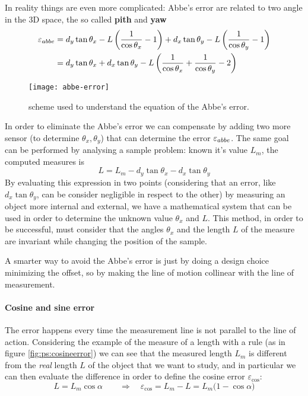 	In reality things are even more complicated: Abbe's error are related to two angle in the 3D space, the so called \textbf{pith} and \textbf{yaw}
	\begin{equation}
	\begin{split}		
		\varepsilon_{abbe} & = d_y \tan\theta_x - L \left(\frac 1 {\cos\theta_x} - 1\right) + d_x \tan\theta_y - L \left(\frac 1 {\cos\theta_y} - 1\right) \\
		& = d_y \tan\theta_x + d_x\tan\theta_y - L\left( \frac 1 {\cos\theta_x} + \frac 1 {\cos\theta_y} - 2 \right)
	\end{split}
	\end{equation}
	
	\begin{SCfigure}[2][bht]
		\centering
		\texttt{[image: abbe-error]}
		\caption{scheme used to understand the equation of the Abbe's error.} 
	\end{SCfigure}

	In order to eliminate the Abbe's error we can compensate by adding two more sensor (to determine $\theta_x,\theta_y$) that can determine the error $\varepsilon_{abbe}$. The same goal can be performed by analysing a sample problem: known it's value $L_m$, the computed measures is
	\[ L = L_m - d_y\tan\theta_x - d_x\tan\theta_y \]
	By evaluating this expression in two points (considering that an error, like $d_x\tan\theta_y$, can be consider negligible in respect to the other) by measuring an object more internal and external, we have a mathematical system that can be used in order to determine the unknown value $\theta_x$ and $L$. This method, in order to be successful, must consider that the angles $\theta_x$ and the length $L$ of the measure are invariant while changing the position of the sample.
	
	A smarter way to avoid the Abbe's error is just by doing a design choice minimizing the offset, so by making the line of motion collinear with the line of measurement.
	
	\paragraph{Cosine and sine error} The  error happens every time the measurement line is not parallel to the line of action. Considering the example of the measure of a length with a rule (as in figure \ref{fig:ps:cosineerror}) we can see that the measured length $L_m$ is different from the \textit{real} length $L$ of the object that we want to study, and in particular we can then evaluate the difference in order to define the cosine error $\varepsilon_{\cos}$:
	\begin{equation}
		L = L_m \cos\alpha \qquad \Rightarrow \quad \varepsilon_{\cos} = L_m - L = L_m \big(1-\cos\alpha\big)
	\end{equation}
	
